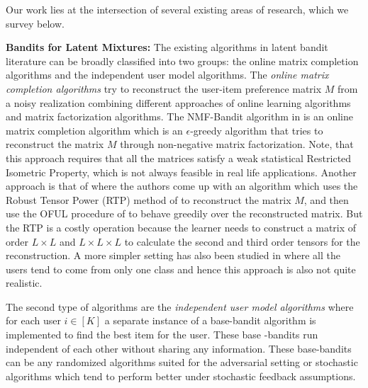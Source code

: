 Our work lies at the intersection of several existing areas of research, which we survey below. 

\textbf{Bandits for Latent Mixtures:} The existing algorithms in latent bandit literature can be broadly classified into two groups: the online matrix completion algorithms and the independent user model algorithms. The \textit{online matrix completion algorithms} try to reconstruct the user-item preference matrix $M$ from a noisy realization combining different approaches of online learning algorithms and matrix factorization algorithms. 
The NMF-Bandit algorithm in \citet{sen2016contextual} is an online matrix completion algorithm which is an $\epsilon$-greedy algorithm that tries to reconstruct the matrix $M$ through non-negative matrix factorization. Note, that this approach requires that all the matrices satisfy a weak statistical Restricted Isometric Property, which is not always feasible in real life applications. Another approach is that of \citet{gopalan2016low} where the authors come up with an algorithm which uses the Robust Tensor Power (RTP) method of 
\citet{anandkumar2014tensor} to reconstruct the matrix $M$, and then use the OFUL procedure of \citet{abbasi2011improved} to behave greedily over the reconstructed matrix. 
But the RTP is a costly operation because the learner needs to construct a matrix of order $L\times L$ and $L\times L \times L$ to calculate the second and third order tensors for the reconstruction.  A more simpler setting has also been studied in \citet{maillard2014latent} where all the users tend to come from only one class and hence this approach is also not quite realistic. 

The second type of algorithms are the \textit{independent user model algorithms} where for each user $i\in[K]$ a separate instance of a base-bandit algorithm is implemented to find the best item for the user. These base -bandits run independent of each other without sharing any information. These base-bandits can be any randomized algorithms suited for the adversarial setting or  stochastic algorithms which tend to perform better under stochastic feedback assumptions.


